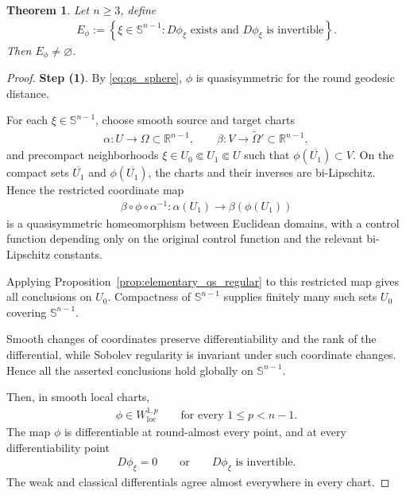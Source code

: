 \documentclass[11pt]{amsart}
\theoremstyle{plain}
\newtheorem{theorem}{Theorem}[section]
\theoremstyle{plain}
\theoremstyle{plain}
\newcommand{\R}{\mathbb R}
\numberwithin{equation}{section}
\begin{document}
\begin{theorem}\label{thm:E_nonempty}
Let \(n\geq 3\), define
\begin{align}
E_\phi:=\left\{\xi\in \mathbb{S}^{n-1}: D\phi_\xi\text{ exists and }D\phi_\xi\text{ is invertible}\right\}.
\nonumber
\end{align}
Then \(E_\phi\neq\varnothing\).
\end{theorem}

\begin{proof}
\textbf{Step (1)}. By \eqref{eq:qs_sphere}, \(\phi\) is quasisymmetric for the
round geodesic distance.

For each \(\xi\in \mathbb{S}^{n-1}\), choose smooth source and target charts
\begin{align}
\alpha:U\longrightarrow\Omega\subset\R^{n-1},
\qquad
\beta:V\longrightarrow\widetilde\Omega'\subset\R^{n-1},
\nonumber
\end{align}
and precompact neighborhoods
\(\xi\in U_0\Subset U_1\Subset U\) such that
\(\phi(\overline{U_1})\subset V\).  On the compact sets
\(\overline{U_1}\) and \(\phi(\overline{U_1})\), the charts and their
inverses are bi-Lipschitz.  Hence the restricted coordinate map
\begin{align}
\beta\circ\phi\circ\alpha^{-1}:
\alpha(U_1)\longrightarrow\beta(\phi(U_1))
\nonumber
\end{align}
is a quasisymmetric homeomorphism between Euclidean domains, with a control
function depending only on the original control function and the relevant
bi-Lipschitz constants.

Applying Proposition~\ref{prop:elementary_qs_regular} to this restricted map
gives all conclusions on \(U_0\).  Compactness of \( \mathbb{S}^{n-1}\) supplies finitely
many such sets \(U_0\) covering \( \mathbb{S}^{n-1}\).

Smooth changes of coordinates preserve   differentiability and the rank of the differential, while Sobolev regularity is invariant under such coordinate changes. Hence all the asserted conclusions hold
globally on \( \mathbb{S}^{n-1}\).

Then, in smooth local charts,
\begin{align}
\phi\in W^{1,p}_{\mathrm{loc}}
\qquad
\text{for every }1\leq p<n-1.\label{regularity-of-phi}
\end{align}
The map \(\phi\) is   differentiable at round-almost every point,
and at every differentiability point
\begin{align}
D\phi_\xi=0
\qquad\text{or}\qquad
D\phi_\xi\text{ is invertible}.\nonumber
\end{align}
The weak and classical differentials agree almost everywhere in every
chart.


\end{proof}
\end{document}
